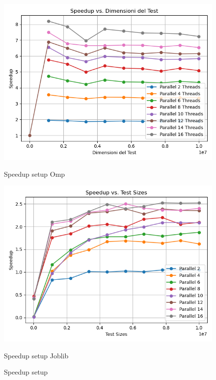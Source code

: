 \documentclass[11pt]{article}
\begin{document}
    \begin{figure}[H]
        \centering
        \includegraphics[width=\linewidth]{omp/005/filter_speedup_plot}
            \caption{Speedup setup Omp}\label{fig:005-filter_speedup_omp}
        \endminipage\hfill
        \includegraphics[width=\linewidth]{joblib/005/filter_speedup_plot}
            \caption{Speedup setup Joblib}\label{fig:005-filter_speedup_joblib}
        \endminipage\hfill
        \caption{Speedup setup}
    \end{figure}
\end{document}

